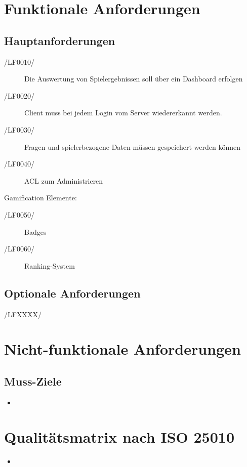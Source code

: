 \documentclass[11pt,a4paper]{scrreprt}
\begin{document}
\chapter{Funktionale Anforderungen}
\section{Hauptanforderungen}
\begin{description}
\item[/LF0010/] Die Auswertung von Spielergebnissen soll über ein Dashboard erfolgen
\item[/LF0020/] Client muss bei jedem Login vom Server wiedererkannt werden.
\item[/LF0030/] Fragen und spielerbezogene Daten müssen gespeichert werden können
\item[/LF0040/] ACL zum Administrieren
\end{description}
Gamification Elemente:
\begin{description}
\item[/LF0050/] Badges
\item[/LF0060/] Ranking-System
\end{description}
\section{Optionale Anforderungen}
\begin{description}
\item[/LFXXXX/]
\end{description}

\chapter{Nicht-funktionale Anforderungen}
\section{Muss-Ziele}
\begin{itemize}
\item 
\end{itemize}

\chapter{Qualitätsmatrix nach ISO 25010}
\begin{itemize}
\item
\end{itemize}
\end{document}
